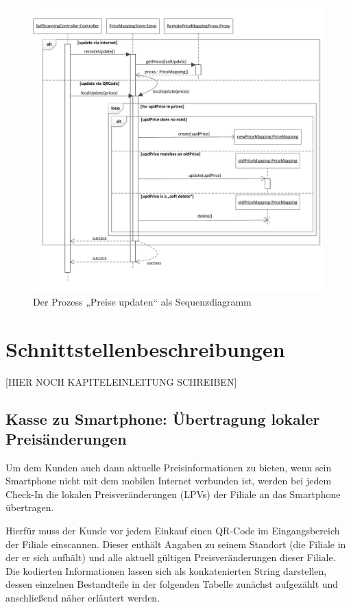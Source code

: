 \begin{figure}[H]
\includegraphics[width=\linewidth]{res/seq_preise-updaten.pdf}
\caption{Der Prozess „Preise updaten“ als Sequenzdiagramm}
\end{figure}

\section{Schnittstellenbeschreibungen}
[HIER NOCH KAPITELEINLEITUNG SCHREIBEN]

\subsection{Kasse zu Smartphone: Übertragung lokaler Preisänderungen}
Um dem Kunden auch dann aktuelle Preisinformationen zu bieten, wenn sein Smartphone nicht mit dem mobilen Internet verbunden ist, werden bei jedem Check-In die lokalen Preisveränderungen (LPVs) der Filiale an das Smartphone übertragen.

Hierfür muss der Kunde vor jedem Einkauf einen QR-Code im Eingangsbereich der Filiale einscannen. Dieser enthält Angaben zu seinem Standort (die Filiale in der er sich aufhält) und alle aktuell gültigen Preisveränderungen dieser Filiale. Die kodierten Informationen lassen sich als konkatenierten String darstellen, dessen einzelnen Bestandteile in der folgenden Tabelle zunächst aufgezählt und anschließend näher erläutert werden.

